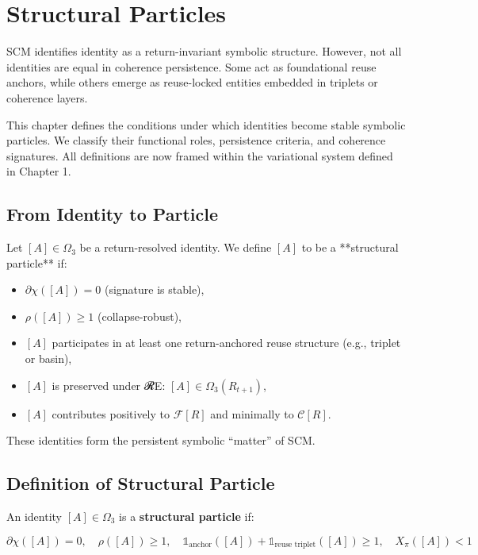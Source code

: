 \chapter{Structural Particles} \label{chapter-structural-particles}

SCM identifies identity as a return-invariant symbolic structure. However, not all identities are equal in coherence persistence. Some act as foundational reuse anchors, while others emerge as reuse-locked entities embedded in triplets or coherence layers.

This chapter defines the conditions under which identities become stable symbolic particles. We classify their functional roles, persistence criteria, and coherence signatures. All definitions are now framed within the variational system defined in Chapter 1.

\section{From Identity to Particle} \label{sec:identity-to-particle}

Let $[A] \in \Omega_3$ be a return-resolved identity. We define $[A]$ to be a **structural particle** if:

\begin{itemize}
  \item $\partial\chi([A]) = 0$ (signature is stable),
  \item $\rho([A]) \geq 1$ (collapse-robust),
  \item $[A]$ participates in at least one return-anchored reuse structure (e.g., triplet or basin),
  \item $[A]$ is preserved under 𝓡E: $[A] \in \Omega_3(R_{t+1})$,
  \item $[A]$ contributes positively to $\mathcal{F}[R]$ and minimally to $\mathcal{C}[R]$.
\end{itemize}

These identities form the persistent symbolic “matter” of SCM.

\section{Definition of Structural Particle} \label{sec:def-structural-particle}

\begin{definition}
An identity $[A] \in \Omega_3$ is a \textbf{structural particle} if:

\[
\partial\chi([A]) = 0,\quad
\rho([A]) \geq 1,\quad
\mathbb{1}_{\text{anchor}}([A]) + \mathbb{1}_{\text{reuse triplet}}([A]) \geq 1,\quad
X_\pi([A]) < 1
\]
\end{definition}

